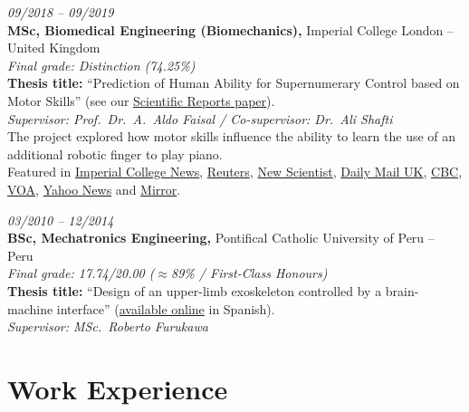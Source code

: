 \documentclass[a4paper,10pt]{article}
\newcommand{\cvdate}[1]{\textit{#1}}
\begin{document}
\vspace{4pt}
\cvdate{09/2018 -- 09/2019}\\
\textbf{MSc, Biomedical Engineering (Biomechanics),} Imperial College London -- United Kingdom\\
\textit{Final grade: Distinction (74.25\%)}\\
\textbf{Thesis title:} ``Prediction of Human Ability for Supernumerary Control based on Motor
Skills'' (see our
\href{https://www.nature.com/articles/s41598-021-00376-6}{Scientific Reports paper}).\\
\textit{Supervisor: Prof.\ Dr.\ A.\ Aldo Faisal / Co-supervisor: Dr.\ Ali Shafti}\\
The project explored how motor skills influence the ability to learn the use of an additional
robotic finger to play piano.\\
Featured in
\href{https://www.imperial.ac.uk/news/232077/pianists-learn-play-with-robotic-third/}{Imperial College News},
\href{https://www.reuters.com/lifestyle/hands-on-experience-pianists-learn-play-with-robot-thumb-2021-08-25/}{Reuters},
\href{https://www.newscientist.com/article/2286166-pianists-fitted-with-robotic-thumb-can-learn-to-play-with-11-digits/}{New Scientist},
\href{https://www.dailymail.co.uk/sciencetech/article-9879571/Pianists-fitted-robotic-THUMB-adjust-playing-hour.html}{Daily Mail UK},
\href{https://www.cbc.ca/player/play/video/1.6152450}{CBC},
\href{https://learningenglish.voanews.com/a/pianists-learn-to-play-with-an-extra-robotic-thumb/6017583.html}{VOA},
\href{https://uk.news.yahoo.com/pianists-learn-play-extra-robotic-135848516.html}{Yahoo News} and
\href{https://www.mirror.co.uk/news/uk-news/piano-players-extra-robotic-thumb-25796622}{Mirror}.

\vspace{4pt}
\cvdate{03/2010 -- 12/2014}\\
\textbf{BSc, Mechatronics Engineering,} Pontifical Catholic University of Peru -- Peru\\
\textit{Final grade: 17.74/20.00 ($\approx$89\% / First-Class Honours)}\\
\textbf{Thesis title:} ``Design of an upper-limb exoskeleton controlled by a brain-machine
interface'' (\href{http://tesis.pucp.edu.pe/repositorio/handle/20.500.12404/6198}{available
online} in Spanish).\\
\textit{Supervisor: MSc.\ Roberto Furukawa}

\section{Work Experience}
\end{document}

